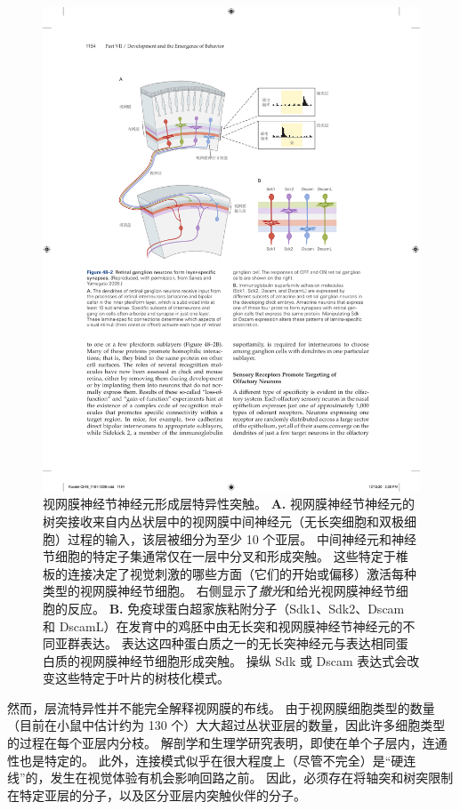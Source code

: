\begin{figure}[htbp]
	\centering
	\includegraphics[width=0.97\linewidth]{chap48/fig_48_2}
	\caption{视网膜神经节神经元形成层特异性突触。
		\textbf{A.} 视网膜神经节神经元的树突接收来自内丛状层中的视网膜中间神经元（无长突细胞和双极细胞）过程的输入，该层被细分为至少 10 个亚层。
		中间神经元和神经节细胞的特定子集通常仅在一层中分叉和形成突触。
		这些特定于椎板的连接决定了视觉刺激的哪些方面（它们的开始或偏移）激活每种类型的视网膜神经节细胞。
		右侧显示了\textit{撤光}和给光视网膜神经节细胞的反应。
		\textbf{B.} 免疫球蛋白超家族粘附分子（Sdk1、Sdk2、Dscam 和 DscamL）在发育中的鸡胚中由无长突和视网膜神经节神经元的不同亚群表达。
		表达这四种蛋白质之一的无长突神经元与表达相同蛋白质的视网膜神经节细胞形成突触。
		操纵 Sdk 或 Dscam 表达式会改变这些特定于叶片的树枝化模式。}
	\label{fig:48_2}
\end{figure}


然而，层流特异性并不能完全解释视网膜的布线。
由于视网膜细胞类型的数量（目前在小鼠中估计约为 130 个）大大超过丛状亚层的数量，因此许多细胞类型的过程在每个亚层内分枝。
解剖学和生理学研究表明，即使在单个子层内，连通性也是特定的。
此外，连接模式似乎在很大程度上（尽管不完全）是“硬连线”的，发生在视觉体验有机会影响回路之前。
因此，必须存在将轴突和树突限制在特定亚层的分子，以及区分亚层内突触伙伴的分子。


